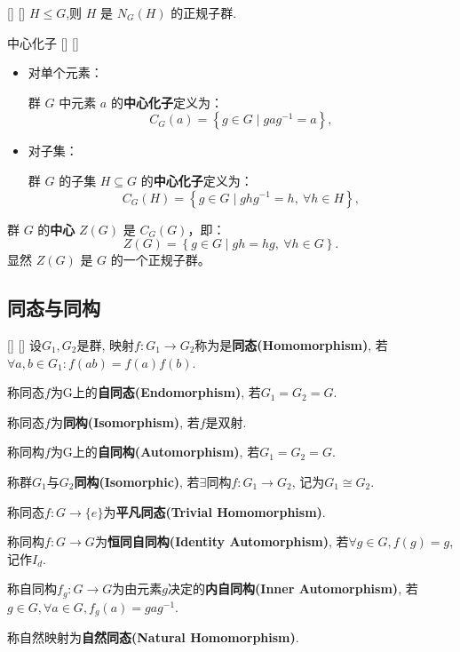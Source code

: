 \documentclass[UTF8]{ctexart}
\begin{document}
		\begin{xmp}
            []
            {}
            []
            []
			$H \leq G$,则 $H$ 是 $N_G(H)$ 的正规子群.
		\end{xmp}

	\begin{dfn}
        []
        {中心化子}
		[]
        []
        \hspace{1em}
			\begin{itemize}
				\item {对单个元素：}
				
				群 \( G \) 中元素 \( a \) 的\textbf{中心化子}定义为：
				\[
				C_G(a) = \left\{ g \in G \mid gag^{-1} = a \right\},
				\]

				\item {对子集：}
				
				群 \( G \) 的子集 \( H \subseteq G \) 的\textbf{中心化子}定义为：
				\[
				C_G(H) = \left\{ g \in G \mid ghg^{-1} = h,\ \forall h \in H \right\},
				\]

				\end{itemize}
				
			群 \( G \) 的\textbf{中心} \( Z(G) \) 是 \( C_G(G) \)，即：
				\[
				Z(G) = \left\{ g \in G \mid gh = hg,\ \forall h \in G \right\}.
				\]
			显然 \( Z(G) \) 是 \( G \) 的一个正规子群。
		\end{dfn}

	
	\subsection{同态与同构}
		\begin{dfn}
            []
            {}
            []
            []
			设$G_1,G_2$是群, 映射$f:G_1\to G_2$称为是\textbf{同态(Homomorphism)}, 若$\forall a,b\in G_1: f(ab)=f(a)f(b)$. 
			
			称同态$f$为G上的\textbf{自同态(Endomorphism)}, 若$G_1=G_2=G$. 
			
			称同态$f$为\textbf{同构(Isomorphism)}, 若$f$是双射. 
			
			称同构$f$为G上的\textbf{自同构(Automorphism)}, 若$G_1=G_2=G$. 
			
			称群$G_1$与$G_2$\textbf{同构(Isomorphic)}, 若$\exists$同构$f:G_1\to G_2$, 记为$G_1\cong G_2$. 
			
			称同态$f:G\to \{e\}$为\textbf{平凡同态(Trivial Homomorphism)}. 
			
			称同构$f:G\to G$为\textbf{恒同自同构(Identity Automorphism)}, 若$\forall g\in G, f(g)=g$, 记作$I_d$. 
			
			称自同构$f_g:G\to G$为由元素$g$决定的\textbf{内自同构(Inner Automorphism)}, 若$g\in G, \forall a\in G, f_g(a)=gag^{-1}$. 
			
			称自然映射为\textbf{自然同态(Natural Homomorphism)}. 
		\end{dfn}
		
\end{document}
